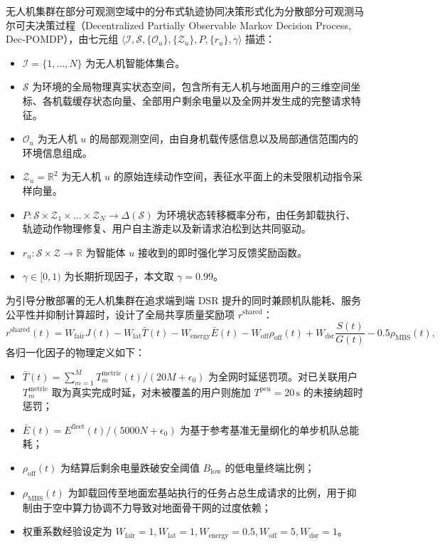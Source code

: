 无人机集群在部分可观测空域中的分布式轨迹协同决策形式化为分散部分可观测马尔可夫决策过程（Decentralized Partially Observable Markov Decision Process, Dec-POMDP），由七元组 $\langle\mathcal I, \mathcal S, \{\mathcal O_u\}, \{\mathcal Z_u\}, P, \{r_u\}, \gamma\rangle$ 描述：
\begin{itemize}
    \item $\mathcal I = \{1, \dots, N\}$ 为无人机智能体集合。
    \item $\mathcal S$ 为环境的全局物理真实状态空间，包含所有无人机与地面用户的三维空间坐标、各机载缓存状态向量、全部用户剩余电量以及全网并发生成的完整请求特征。
    \item $\mathcal O_u$ 为无人机 $u$ 的局部观测空间，由自身机载传感信息以及局部通信范围内的环境信息组成。
    \item $\mathcal Z_u = \mathbb R^2$ 为无人机 $u$ 的原始连续动作空间，表征水平面上的未受限机动指令采样向量。
    \item $P: \mathcal S \times \mathcal Z_1 \times \dots \times \mathcal Z_N \to \Delta(\mathcal S)$ 为环境状态转移概率分布，由任务卸载执行、轨迹动作物理修复、用户自主游走以及新请求泊松到达共同驱动。
    \item $r_u: \mathcal S \times \mathcal Z \to \mathbb R$ 为智能体 $u$ 接收到的即时强化学习反馈奖励函数。
    \item $\gamma \in [0, 1)$ 为长期折现因子，本文取 $\gamma = 0.99$。
\end{itemize}

为引导分散部署的无人机集群在追求端到端 DSR 提升的同时兼顾机队能耗、服务公平性并抑制计算超时，设计了全局共享质量奖励项 $r^{\mathrm{shared}}$：
\begin{equation}
    r^{\mathrm{shared}}(t) = 
    W_{\mathrm{fair}} J(t) - W_{\mathrm{lat}} \bar T(t) - W_{\mathrm{energy}} \bar E(t)
    - W_{\mathrm{off}} \rho_{\mathrm{off}}(t) + W_{\mathrm{dsr}} \frac{S(t)}{G(t)}
    - 0.5 \rho_{\mathrm{MBS}}(t),
    \label{eq:upper-reward}
\end{equation}
各归一化因子的物理定义如下：
\begin{itemize}
    \item $\bar T(t) = \sum_{m=1}^M T_m^{\mathrm{metric}}(t) / (20M + \epsilon_0)$ 为全网时延惩罚项。对已关联用户 $T_m^{\mathrm{metric}}$ 取为真实完成时延，对未被覆盖的用户则施加 $T^{\mathrm{pen}} = 20\,\mathrm{s}$ 的未接纳超时惩罚；
    \item $\bar E(t) = E^{\mathrm{fleet}}(t) / (5000N + \epsilon_0)$ 为基于参考基准无量纲化的单步机队总能耗；
    \item $\rho_{\mathrm{off}}(t)$ 为结算后剩余电量跌破安全阈值 $B_{\mathrm{low}}$ 的低电量终端比例；
    \item $\rho_{\mathrm{MBS}}(t)$ 为卸载回传至地面宏基站执行的任务占总生成请求的比例，用于抑制由于空中算力协调不力导致对地面骨干网的过度依赖；
    \item 权重系数经验设定为 $W_{\mathrm{fair}}=1, W_{\mathrm{lat}}=1, W_{\mathrm{energy}}=0.5, W_{\mathrm{off}}=5, W_{\mathrm{dsr}}=1$。
\end{itemize}

